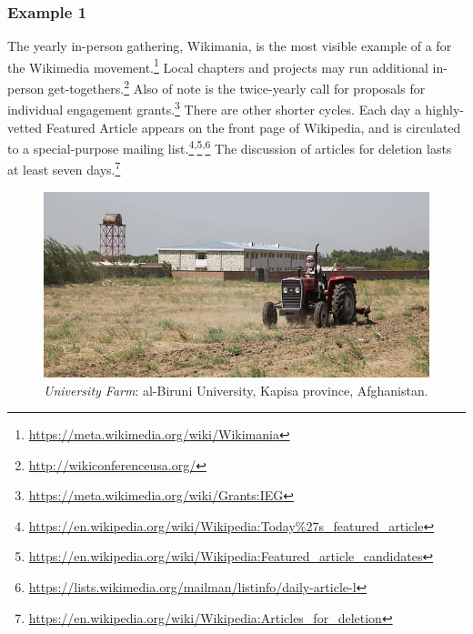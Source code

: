 \subsubsection*{Example 1} The yearly in-person gathering, Wikimania, is the most visible
example of a  for the Wikimedia
movement.\footnote{\url{https://meta.wikimedia.org/wiki/Wikimania}}
Local chapters and projects may run additional in-person
get-togethers.\footnote{\url{http://wikiconferenceusa.org/}} Also of
note is the twice-yearly call for proposals for individual engagement
grants.\footnote{\url{https://meta.wikimedia.org/wiki/Grants:IEG}}
There are other shorter cycles.  
Each day a highly-vetted Featured Article appears on the front page of Wikipedia, and is circulated to a special-purpose mailing list.\footnote{\url{https://en.wikipedia.org/wiki/Wikipedia:Today\%27s_featured_article}}\textsuperscript{,}\footnote{\url{https://en.wikipedia.org/wiki/Wikipedia:Featured_article_candidates}}\textsuperscript{,}\footnote{\url{https://lists.wikimedia.org/mailman/listinfo/daily-article-l}}
The discussion of articles for
deletion lasts at least seven days.\footnote{\url{https://en.wikipedia.org/wiki/Wikipedia:Articles_for_deletion}}


\begin{figure}[t]
\includegraphics[width=\textwidth,trim=0 40 0 40, clip=true]{kapisa.png}
\caption{\textsl{University Farm}: al-Biruni University, Kapisa province, Afghanistan.
\label{farm}}
\end{figure}

